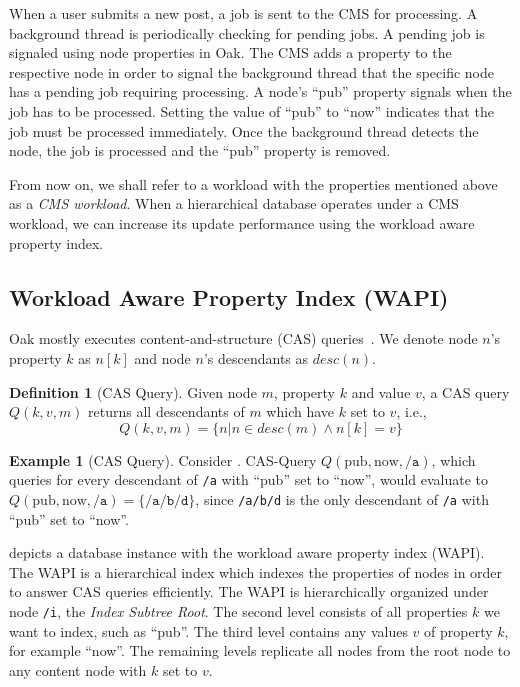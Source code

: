 \documentclass[abstracton,12pt]{scrartcl}
\theoremstyle{definition}
\newtheorem{definition}{Definition}
\newtheorem{example}{Example}
\begin{document}
When a user submits a new post, a job \cite{Job} is sent to the CMS for processing. %
A background thread is periodically checking for pending
jobs. A pending job is signaled using node properties in Oak.
The CMS adds a property to the respective node in
order to signal the background thread that the specific node has a pending job requiring
processing. A node's ``pub'' property signals when the job has to be processed.
Setting the value of ``pub'' to ``now'' indicates that the job must be processed
immediately.
Once the background thread detects the node, the job is processed and the ``pub''
property is removed.

From now on, we shall refer to a workload with the properties mentioned above as
a \textit{CMS workload}. When a hierarchical database operates under a CMS
workload, we can increase its update performance using the workload aware
property index.

\subsection{Workload Aware Property Index (WAPI)}
\label{sec:wapi}

Oak mostly executes content-and-structure (CAS) queries~\cite{CM15}.
We denote node $n$'s property $k$ as $n[k]$ and node $n$'s descendants as
$desc(n)$.

\begin{definition}[CAS Query]
  Given node $m$, property $k$ and value $v$, a CAS query
  $Q(k,v,m)$ returns all descendants of $m$ which have $k$ set to $v$, i.e.,
  $$ Q(k,v,m) = \{ n | n \in desc(m) \land n[k] = v\} $$
  \label{def:cas-query}
\end{definition}

\begin{example}[CAS Query]
  Consider . CAS-Query $Q(\text{pub},\text{now},\texttt{/a})$,
  which queries for every descendant of \texttt{/a} with
  ``pub'' set to ``now'', would evaluate to $Q(\text{pub},\text{now},\texttt{/a}) = \{\texttt{/a/b/d}\}$,
  since \texttt{/a/b/d} is the only descendant of \texttt{/a} with ``pub'' set
  to ``now''.
  \label{ex:cas_query}
\end{example}

 depicts a database instance with the workload aware
property index (WAPI).
The WAPI is a hierarchical index which indexes the properties of nodes in order
to answer CAS queries efficiently.
The WAPI is hierarchically organized under node \texttt{/i}, the
\textit{Index Subtree Root}.
The second level consists of all properties $k$ we want
to index, such as ``pub''.
The third level contains any values $v$ of property $k$, for example
``now''.
The remaining levels replicate all nodes from the root node to any
content node with $k$ set to $v$.
\end{document}
